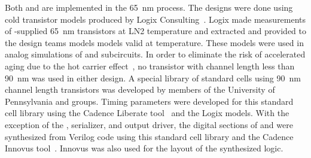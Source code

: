 Both  and  are implemented in the 
 \SI{65}{nm}  process. The designs were 
done using cold transistor models produced by Logix Consulting~\cite{Logix}.
Logix made measurements of -supplied  
\SI{65}{nm} transistors at LN2 temperature and extracted and provided 
to the design teams  models models valid at \lntwo 
temperature.  These models were used in analog simulations of 
 and  subcircuits.  In order to 
eliminate the risk of accelerated aging due to the hot carrier 
effect~\cite{Hot-electron}, no transistor with channel length 
less than \SI{90}{nm} was used in either  design.  
A special library of standard cells using \SI{90}{nm} channel 
length transistors was developed by members of the University 
of Pennsylvania and  groups. Timing parameters were 
developed for this standard cell library using the Cadence Liberate 
tool~\cite{Liberate} and the Logix  models. With the 
exception of the  , serializer, and 
output driver, the digital sections of  and 
 were synthesized from Verilog code using this 
standard cell library and the Cadence Innovus tool~\cite{Innovus}.
Innovus was also used for the layout of the synthesized logic.


\label{sec:fdsp-tpcelec-design-femb-alt-cryo}

